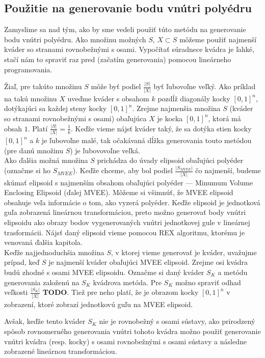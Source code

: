 \subsection{Použitie na generovanie bodu vnútri polyédru}

Zamyslime sa nad tým, ako by sme vedeli použiť túto metódu na generovanie bodu vnútri polyédru. Ako množinu možných $S$, $X \subset S$ môžeme použiť najmenší kváder so stranami rovnobežnými s osami. Vypočítať súradnece kvádra je ľahké, stačí nám to spraviť raz pred (začatím generovania) pomocou lineárneho programovania.

Žiaľ, pre takúto množinu $S$ môže byť podiel $\frac{|S|}{|X|}$ byť ľubovoľne veľký. Ako príklad na takú množinu $X$ uveďme kváder s obsahom $k$ pozdĺž diagonály kocky $[0,1]^n$, dotýkajúci sa každej steny kocky $[0,1]^n$. Zrejme najmenšia množina $S$ (kváder so stranami rovnobežnými s osami) obaľujúca $X$ je kocka $[0,1]^n$, ktorá má obsah $1$. Platí $\frac{|S|}{|X|}=\frac{1}{k}$. Keďže vieme nájsť kváder taký, že sa dotýka stien kocky $[0,1]^n$ a $k$ je ľubovoľne malé, tak očakávaná dĺžka generovania touto metódou (pre danú množinu $S$) je ľubovovoľne veľká.\\

Ako ďalšia možná množina $S$ prichádza do úvady elipsoid obaľujúci polyéder (označme si ho $S_{MVEE}$). Keďže chceme, aby bol podiel $\frac{|S_{MVEE}|}{|X|}$ čo najmenší, budeme skúmať elipsoid s najmenším obsahom obaľujúci polyéder --- Minumum Volume Enclosing Elipsoid (ďalej MVEE). Môžeme si všimnúť, že MVEE elipsoid obsahuje veľa informácie o tom, ako vyzerá polyéder. Keďže elipsoid je jednotková guľa zobrazená lineárnou transformáciou, preto možno generovať body vnútri elipsoidu ako obrazy bodov vygenerovaných vnútri jednotkovej gule v lineárnej trasformácii. Nájsť daný elipsoid vieme pomocou REX algoritmu, ktorému je venovaná ďalšia kapitola.\\

Keďže najjednoduchšia množina $S$, v ktorej vieme generovať je kváder, uvažujme prípad, keď $S$ je najmenší kváder obaľujúci MVEE elipsoid. Zrejme osi kvádra budú zhodné s osami MVEE elipsoidu. Označme si daný kváder $S_K$ a metódu generovania založenú na $S_K$ kvádrova metóda. Pre $S_K$ možno spraviť odhad veľkosti $\frac{|S_K|}{|X|}$ \textbf{TODO}. Tiež pre neho platí, že je obrazom kocky $[0,1]^n$ v zobrazení, ktoré zobrazí jednotkovú guľu na MVEE elipsoid.

Avšak, keďže tento kváder $S_K$ nie je rovnobežný s osami sústavy, ako prirodzený spôsob rovnomerného generovania vnútri tohoto kvádra možno použiť generovanie vnútri kvádra (resp. kocky) s osami rovnobežnými s osami sústavy a následne zobrazené lineárnou transformáciou.\\

